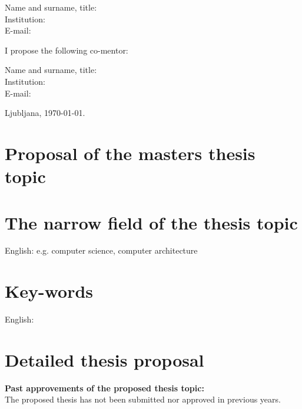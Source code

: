 \documentclass[a4paper, 12pt]{article}
\begin{document}
\hfill\begin{minipage}{\dimexpr\textwidth-2cm}
Name and surname, title: \\
Institution: \\
E-mail:
\end{minipage}

I propose the following co-mentor:

\hfill\begin{minipage}{\dimexpr\textwidth-2cm}
Name and surname, title: \\
Institution: \\
E-mail:
\end{minipage}

\bigskip

\hfill Ljubljana, \today.


\clearpage
\section*{Proposal of the masters thesis topic}

\section{The narrow field of the thesis topic}

English: e.g. computer science, computer architecture


\section{Key-words}

English:


\section{Detailed thesis proposal}


\textbf{Past approvements of the proposed thesis topic:}\\
The proposed thesis has not been submitted nor approved in previous years.

\end{document}
